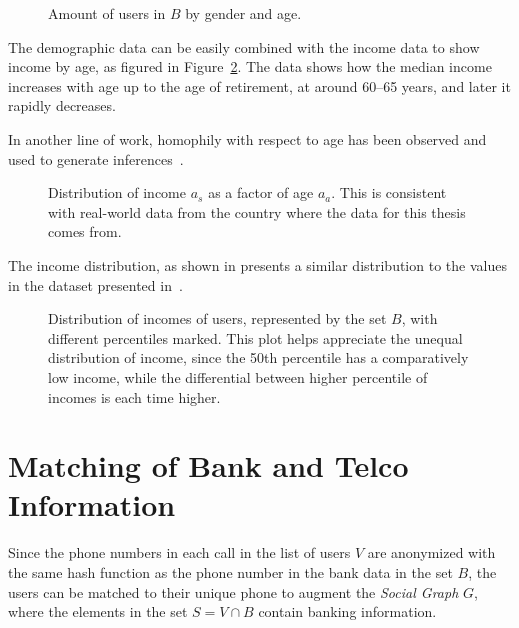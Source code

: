 \begin{figure}
\centering
{}
\caption{Amount of users in $B$ by gender and age.}
\label{fig:gender_age_bar}
\end{figure}

The demographic data can be easily combined with the income data to show income by age, as figured in Figure~\ref{fig:income_age_boxplot}. The data shows how the median income increases with age up to the age of retirement, at around 60--65 years, and later it rapidly decreases.

In another line of work, homophily with respect to age has been observed and used to generate inferences~\cite{brea2014}.

\begin{figure}
\centering
{}
\caption{Distribution of income $a_s$ as a factor of age $a_a$. This is consistent with real-world data from the country where the data for this thesis comes from.}
\label{fig:income_age_boxplot}
\end{figure}

The income distribution, as shown in  presents a similar distribution to the values in the dataset presented in~.

\begin{figure}
\centering
{}
\caption{Distribution of incomes of users, represented by the set $B$, with different percentiles marked. This plot helps appreciate the unequal distribution of income, since the 50th percentile has a comparatively low income, while the differential between higher percentile of incomes is each time higher.}
\label{fig:incomedistribution}
\end{figure}

\section{Matching of Bank and Telco Information}
\label{subsec:banktencomathing}

Since the phone numbers in each call in the list of users $V$ are anonymized with the same hash function as the phone number in the bank data in the set $B$, the users can be matched to their unique phone to augment the \emph{Social Graph} $G$, where the elements in the set $S = V \cap B$ contain banking information.

